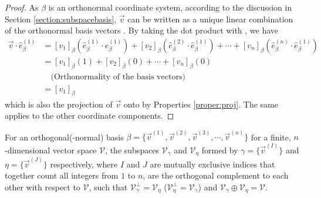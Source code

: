 \begin{proof}
As $\beta$ is an orthonormal coordinate system, according to the discussion in Section \ref{section:subspacebasis}, $\vec{v}$ can be written as a unique linear combination of the orthonormal basis vectors . By taking the dot product with , we have
\begin{align*}
\vec{v} \cdot \hat{e}_\beta^{(1)} &= [v_1]_\beta (\hat{e}_\beta^{(1)} \cdot \hat{e}_\beta^{(1)}) + [v_2]_\beta (\hat{e}_\beta^{(2)} \cdot \hat{e}_\beta^{(1)}) + \cdots + [v_n]_\beta (\hat{e}_\beta^{(n)} \cdot \hat{e}_\beta^{(1)}) \\
&= [v_1]_\beta (1) + [v_2]_\beta (0) + \cdots + [v_n]_\beta (0) \\
&\quad \text{(Orthonormality of the basis vectors)} \\
&= [v_1]_\beta
\end{align*}
which is also the projection of $\vec{v}$ onto  by Properties \ref{proper:proj}. The same applies to the other coordinate components.
\end{proof}
\begin{proper}
\label{proper:orthodirectsum}
For an orthogonal(-normal) basis $\mathcal{\beta} = \{\vec{v}^{(1)}, \vec{v}^{(2)}, \vec{v}^{(3)}, \cdots, \allowbreak \vec{v}^{(n)}\}$ for a finite, $n$-dimensional vector space $\mathcal{V}$, the subspaces $\mathcal{V}_\gamma$ and $\mathcal{V}_\eta$ formed by $\mathcal{\gamma} = \{\vec{v}^{(I)}\}$ and $\mathcal{\eta} = \{\vec{v}^{(J)}\}$ respectively, where $I$ and $J$ are mutually exclusive indices that together count all integers from $1$ to $n$, are the orthogonal complement to each other with respect to $\mathcal{V}$, such that $\mathcal{V}_\gamma^\perp = \mathcal{V}_\eta$ ($\mathcal{V}_\eta^\perp = \mathcal{V}_\gamma$) and $\mathcal{V}_\gamma \oplus \mathcal{V}_\eta = \mathcal{V}$.
\end{proper}

